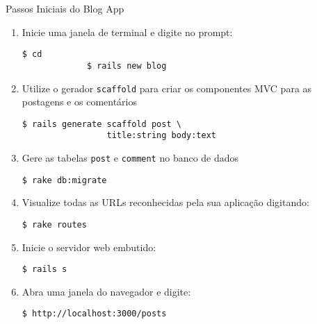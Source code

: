 \begin{frame}{Passos Iniciais do Blog App}
	\begin{enumerate}
	    \item Inicie uma janela de terminal e digite no prompt:
	     \begin{lstlisting}[style=BashInputBasicStyle]
		     $ cd 
		     $ rails new blog
	     \end{lstlisting}
	    \item Utilize o gerador \verb|scaffold| para criar os 
	    componentes MVC para as postagens e os comentários
	     \begin{lstlisting}[style=BashInputBasicStyle]
		     $ rails generate scaffold post \ 
			     title:string body:text
	     \end{lstlisting}
	    \item Gere as tabelas \verb|post| e \verb|comment| no banco de dados
	    \begin{lstlisting}[style=BashInputBasicStyle]
		    $ rake db:migrate
	    \end{lstlisting}
	    
	    \item Visualize todas as URLs reconhecidas pela sua aplicação digitando:
	    \begin{lstlisting}[style=BashInputBasicStyle]
	    $ rake routes
	    \end{lstlisting}
	     \item Inicie o servidor web embutido:
	     \begin{lstlisting}[style=BashInputBasicStyle]
	     $ rails s
	     \end{lstlisting}
	     
	     \item Abra uma janela do navegador e digite:
	     \begin{lstlisting}[style=BashInputBasicStyle]
	     $ http://localhost:3000/posts
	     \end{lstlisting}
	\end{enumerate}
  
\end{frame}